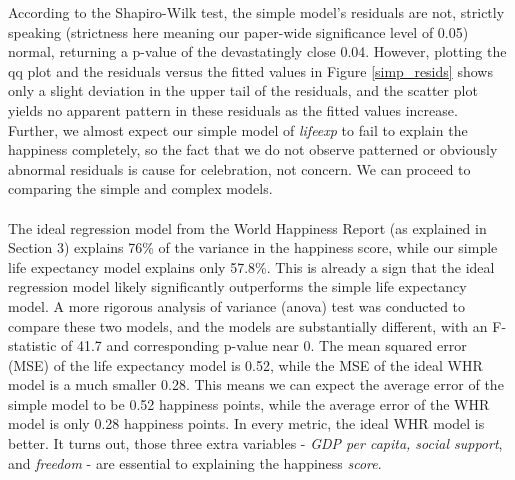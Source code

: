 \documentclass{article}
\begin{document}
According to the Shapiro-Wilk test, the simple model's residuals are not, strictly speaking (strictness here meaning our paper-wide significance level of 0.05) normal, returning a p-value of the devastatingly close 0.04. However, plotting the qq plot and the residuals versus the fitted values in Figure \ref{simp_resids} shows only a slight deviation in the upper tail of the residuals, and the scatter plot yields no apparent pattern in these residuals as the fitted values increase. Further, we almost expect our simple model of \textit{lifeexp} to fail to explain the happiness  completely, so the fact that we do not observe patterned or obviously abnormal residuals is cause for celebration, not concern. We can proceed to comparing the simple and complex models.\\\\
The ideal regression model from the World Happiness Report (as explained in Section 3) explains 76\% of the variance in the happiness score, while our simple life expectancy model explains only 57.8\%. This is already a sign that the ideal regression model likely significantly outperforms the simple life expectancy model. A more rigorous analysis of variance (anova) test was conducted to compare these two models, and the models are substantially different, with an F-statistic of 41.7 and corresponding p-value near 0. The mean squared error (MSE) of the life expectancy model is 0.52, while the MSE of the ideal WHR model is a much smaller 0.28. This means we can expect the average error of the simple model to be 0.52 happiness points, while the average error of the WHR model is only 0.28 happiness points. In every metric, the ideal WHR model is better. It turns out, those three extra variables - \textit{GDP per capita, social support}, and \textit{freedom} - are essential to explaining the happiness \textit{score}.
\end{document}
